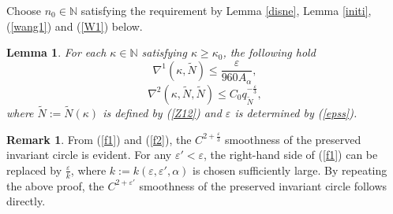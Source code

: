 \documentclass{amsart}
\newtheorem{Lemma}[Definition]{Lemma}
\theoremstyle{definition}
\newtheorem{Remark}[Definition]{Remark}
\begin{document}
Choose $n_0\in \mathbb{N}$ satisfying the requirement by Lemma \ref{disne}, Lemma \ref{initi},  (\ref{wang1}) and (\ref{W1}) below.
\begin{Lemma}\label{las1}
For each  $\kappa\in \mathbb{N}$ satisfying  $\kappa\geq \kappa_0$, the following hold
\begin{equation}\label{f1}
\nabla^1(\kappa,\tilde{N})\leq \frac{\varepsilon}{960A_\alpha},
\end{equation}
\begin{equation}\label{f2}
\nabla^2(\kappa,\tilde{N},\tilde{N})\leq C_0 q_{\tilde{N}}^{-\frac{\varepsilon}{3}},
\end{equation}
where $\tilde{N}:=\tilde{N}(\kappa)$ is defined by (\ref{Z12}) and $\varepsilon$ is determined by (\ref{epss}).
\end{Lemma}
\begin{Remark}\label{RRX}
	From (\ref{f1}) and (\ref{f2}), the $C^{2+\frac{\varepsilon}{3}}$ smoothness of the preserved invariant circle is evident. For any $\varepsilon' < \varepsilon$, the right-hand side of (\ref{f1}) can be replaced by $\frac{\varepsilon}{k}$, where $k := k(\varepsilon, \varepsilon', \alpha)$ is chosen sufficiently large. By repeating the above proof, the $C^{2+\varepsilon'}$ smoothness of the preserved invariant circle follows directly.
\end{Remark}
\end{document}
